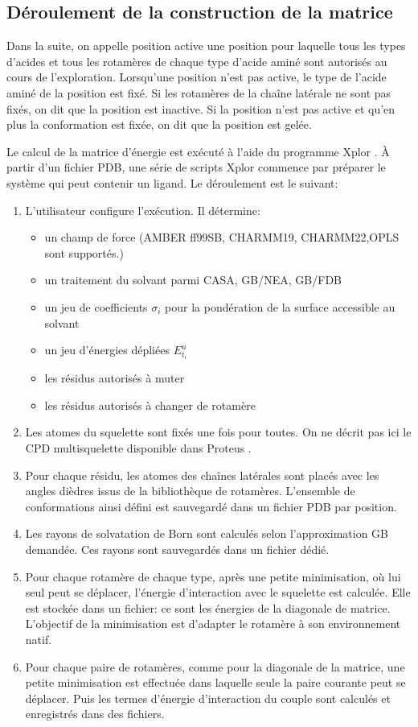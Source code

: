 \subsection{Déroulement de la construction de la matrice}
\label{sub:matrix}
Dans la suite, on appelle position active une position pour laquelle tous les types d'acides et tous les rotamères de chaque type d'acide aminé sont autorisés au cours de l'exploration. Lorsqu'une position n'est pas active, le type de l'acide aminé de la position est fixé. Si les rotamères de la chaîne latérale ne sont pas fixés, on dit que la position est inactive. Si la position n'est pas active et qu'en plus la conformation est fixée, on dit que la position est gelée.

Le calcul de la matrice d'énergie est exécuté à l'aide du programme Xplor \cite{Xplor}. À partir d'un fichier PDB, une série de scripts Xplor commence par préparer le système qui peut contenir un ligand. Le déroulement est le suivant:

\begin{enumerate}[leftmargin=*]
\item L'utilisateur configure l'exécution. Il détermine:
\begin{itemize}
\item un champ de force (AMBER ff99SB, CHARMM19, CHARMM22,OPLS sont supportés.)
\item un traitement du solvant parmi CASA, GB/NEA, GB/FDB
\item un jeu de coefficients $\sigma_i$ pour la pondération de la surface accessible au solvant
\item un jeu d'énergies dépliées $E^u_{t_i}$  
\item les résidus autorisés à muter
\item les résidus autorisés à changer de rotamère 
\end{itemize}
\item Les atomes du squelette sont fixés une fois pour toutes. On ne décrit pas ici le CPD multisquelette disponible dans Proteus \cite{Druart16}.
\item Pour chaque résidu, les atomes des chaînes latérales sont placés avec les angles dièdres issus de la bibliothèque de rotamères. L'ensemble de conformations ainsi défini est sauvegardé dans un fichier PDB par position.
\item Les rayons de solvatation de Born sont calculés selon l'approximation GB demandée. Ces rayons sont sauvegardés dans un fichier dédié.
\item Pour chaque rotamère de chaque type, après une petite minimisation, où lui seul peut se déplacer, l'énergie d'interaction avec le squelette est calculée. Elle est stockée dans un fichier: ce sont les énergies de la diagonale de matrice. L'objectif de la minimisation est d'adapter le rotamère à son environnement natif.
\item Pour chaque paire de rotamères, comme pour la diagonale de la matrice, une petite minimisation est effectuée dans laquelle seule la paire courante peut se déplacer. Puis les termes d'énergie d'interaction du couple sont calculés et enregistrés dans des fichiers.  
\end{enumerate}

